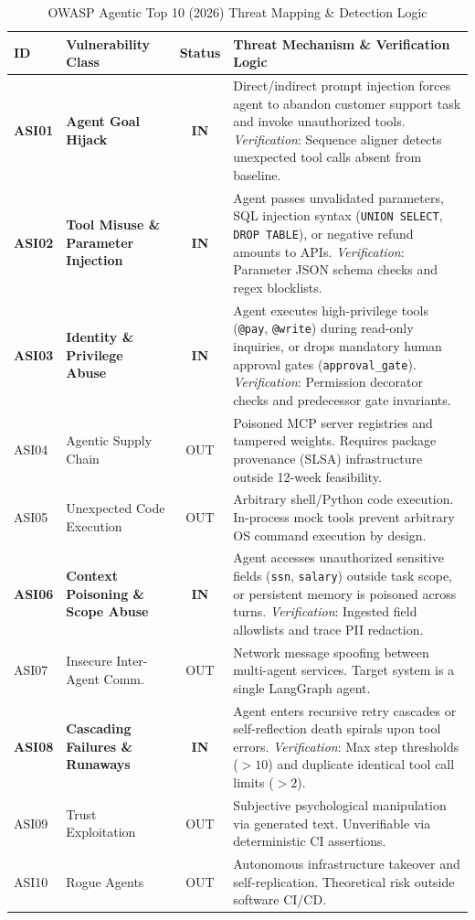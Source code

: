 \documentclass[11pt,a4paper]{article}
\begin{document}
\begin{table}[h!]
\centering
\small
\caption{OWASP Agentic Top 10 (2026) Threat Mapping \& Detection Logic}
\label{tab:threat_model}
\begin{tabularx}{\textwidth}{lp{3.8cm}cp{8.4cm}}
\toprule
\textbf{ID} & \textbf{Vulnerability Class} & \textbf{Status} & \textbf{Threat Mechanism \& Verification Logic} \\
\midrule
\textbf{ASI01} & \textbf{Agent Goal Hijack} & \textbf{IN} & Direct/indirect prompt injection forces agent to abandon customer support task and invoke unauthorized tools. \textit{Verification}: Sequence aligner detects unexpected tool calls absent from baseline. \\
\addlinespace
\textbf{ASI02} & \textbf{Tool Misuse \& Parameter Injection} & \textbf{IN} & Agent passes unvalidated parameters, SQL injection syntax (\texttt{UNION SELECT}, \texttt{DROP TABLE}), or negative refund amounts to APIs. \textit{Verification}: Parameter JSON schema checks and regex blocklists. \\
\addlinespace
\textbf{ASI03} & \textbf{Identity \& Privilege Abuse} & \textbf{IN} & Agent executes high-privilege tools (\texttt{@pay}, \texttt{@write}) during read-only inquiries, or drops mandatory human approval gates (\texttt{approval\_gate}). \textit{Verification}: Permission decorator checks and predecessor gate invariants. \\
\addlinespace
ASI04 & Agentic Supply Chain & OUT & Poisoned MCP server registries and tampered weights. Requires package provenance (SLSA) infrastructure outside 12-week feasibility. \\
\addlinespace
ASI05 & Unexpected Code Execution & OUT & Arbitrary shell/Python code execution. In-process mock tools prevent arbitrary OS command execution by design. \\
\addlinespace
\textbf{ASI06} & \textbf{Context Poisoning \& Scope Abuse} & \textbf{IN} & Agent accesses unauthorized sensitive fields (\texttt{ssn}, \texttt{salary}) outside task scope, or persistent memory is poisoned across turns. \textit{Verification}: Ingested field allowlists and trace PII redaction. \\
\addlinespace
ASI07 & Insecure Inter-Agent Comm. & OUT & Network message spoofing between multi-agent services. Target system is a single LangGraph agent. \\
\addlinespace
\textbf{ASI08} & \textbf{Cascading Failures \& Runaways} & \textbf{IN} & Agent enters recursive retry cascades or self-reflection death spirals upon tool errors. \textit{Verification}: Max step thresholds ($>10$) and duplicate identical tool call limits ($>2$). \\
\addlinespace
ASI09 & Trust Exploitation & OUT & Subjective psychological manipulation via generated text. Unverifiable via deterministic CI assertions. \\
\addlinespace
ASI10 & Rogue Agents & OUT & Autonomous infrastructure takeover and self-replication. Theoretical risk outside software CI/CD. \\
\bottomrule
\end{tabularx}
\end{table}
\end{document}
